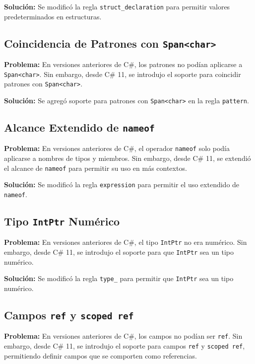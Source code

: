\textbf{Solución:} Se modificó la regla \texttt{struct\_declaration} para permitir valores predeterminados en estructuras.

\subsection{Coincidencia de Patrones con \texttt{Span\textless char\textgreater}}

\textbf{Problema:} En versiones anteriores de C\#, los patrones no podían aplicarse a \texttt{Span\textless char\textgreater}. Sin embargo, desde C\# 11, se introdujo el soporte para coincidir patrones con \texttt{Span\textless char\textgreater}.

\textbf{Solución:} Se agregó soporte para patrones con \texttt{Span\textless char\textgreater} en la regla \texttt{pattern}.

\subsection{Alcance Extendido de \texttt{nameof}}

\textbf{Problema:} En versiones anteriores de C\#, el operador \texttt{nameof} solo podía aplicarse a nombres de tipos y miembros. Sin embargo, desde C\# 11, se extendió el alcance de \texttt{nameof} para permitir su uso en más contextos.

\textbf{Solución:} Se modificó la regla \texttt{expression} para permitir el uso extendido de \texttt{nameof}.

\subsection{Tipo \texttt{IntPtr} Numérico}

\textbf{Problema:} En versiones anteriores de C\#, el tipo \texttt{IntPtr} no era numérico. Sin embargo, desde C\# 11, se introdujo el soporte para que \texttt{IntPtr} sea un tipo numérico.

\textbf{Solución:} Se modificó la regla \texttt{type\_} para permitir que \texttt{IntPtr} sea un tipo numérico.

\subsection{Campos \texttt{ref} y \texttt{scoped ref}}

\textbf{Problema:} En versiones anteriores de C\#, los campos no podían ser \texttt{ref}. Sin embargo, desde C\# 11, se introdujo el soporte para campos \texttt{ref} y \texttt{scoped ref}, permitiendo definir campos que se comporten como referencias.

